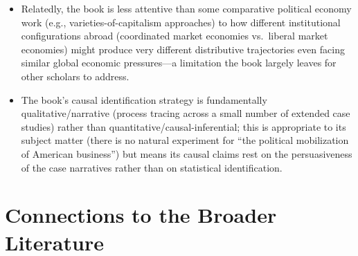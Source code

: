 \documentclass[12pt]{article}
\begin{document}
\begin{itemize}[leftmargin=*, itemsep=4pt]
    \item Relatedly, the book is less attentive than some comparative political economy work (e.g., varieties-of-capitalism approaches) to how different institutional configurations abroad (coordinated market economies vs.\ liberal market economies) might produce very different distributive trajectories even facing similar global economic pressures---a limitation the book largely leaves for other scholars to address.
    \item The book's causal identification strategy is fundamentally qualitative/narrative (process tracing across a small number of extended case studies) rather than quantitative/causal-inferential; this is appropriate to its subject matter (there is no natural experiment for ``the political mobilization of American business'') but means its causal claims rest on the persuasiveness of the case narratives rather than on statistical identification.
\end{itemize}

\section{Connections to the Broader Literature}
\end{document}
